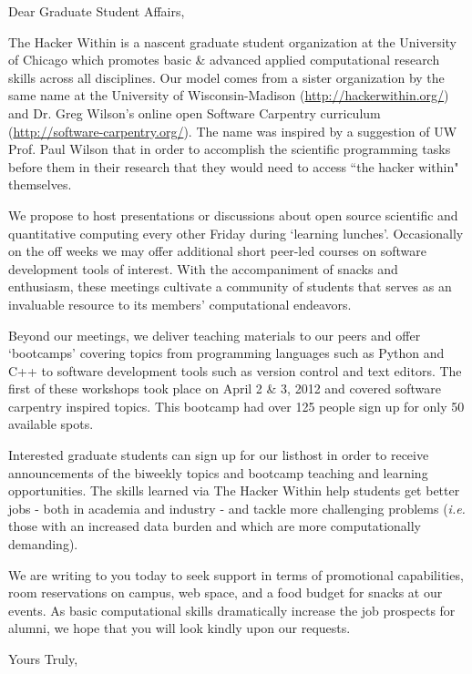 \documentclass{letter}
\begin{document}
\begin{letter}{}
\opening{Dear Graduate Student Affairs,}
The Hacker Within is a nascent graduate student organization at the University of 
Chicago which promotes basic \& advanced applied computational research skills across all 
disciplines.  Our model comes from a sister organization by the same name at 
the University of Wisconsin-Madison (\url{http://hackerwithin.org/}) and Dr. Greg
Wilson's online open Software Carpentry curriculum (\url{http://software-carpentry.org/}). 
The name was inspired by a suggestion of UW Prof. Paul Wilson that in order to 
accomplish the scientific programming tasks before them in their research that 
they would need to access ``the hacker within" themselves.

We propose to host presentations or discussions about open source scientific and quantitative 
computing every other Friday during `learning lunches'.  Occasionally on the off weeks 
we may offer additional short peer-led courses on software development tools of interest. 
With the accompaniment of snacks and enthusiasm, these meetings cultivate a community of 
students that serves as an invaluable resource to its members' computational endeavors.

Beyond our meetings, we deliver teaching materials to our peers and offer `bootcamps' 
covering topics from programming languages such as Python and C++ to software development 
tools such as version control and text editors. The first of these workshops took place 
on April 2 \& 3, 2012 and covered software carpentry inspired topics.  This bootcamp had
over 125 people sign up for only 50 available spots.

Interested graduate students can sign up for our listhost in order to receive announcements 
of the biweekly topics and bootcamp teaching and learning opportunities.  
The skills learned via The Hacker Within help
students get better jobs - both in academia and industry - and tackle more
challenging problems (\emph{i.e.} those with an increased data burden and which are 
more computationally demanding).

We are writing 
to you today to seek support in terms of promotional capabilities, room reservations on 
campus, web space, and a food budget for snacks at our events.  As basic computational 
skills dramatically increase the job prospects for alumni, we hope that you will look
kindly upon our requests.

\closing{Yours Truly,}

\end{letter}
\end{document}
